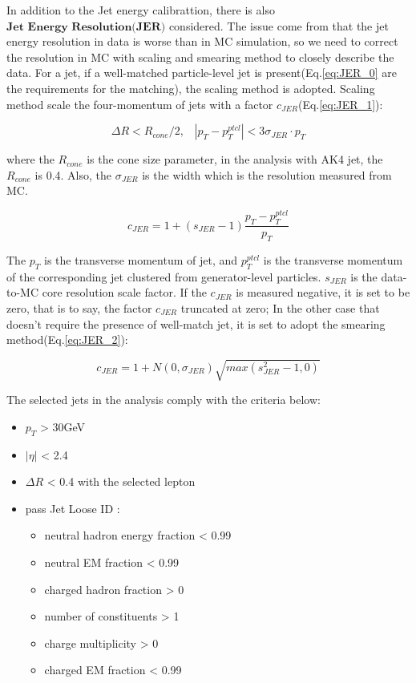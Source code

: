 		In addition to the Jet energy calibrattion, there is also $\textbf{Jet Energy Resolution(JER)}$ considered\cite{JER_twiki}. The issue come from that the jet energy resolution in data is worse than in MC simulation, so we need to correct the resolution in MC with scaling and smearing method to closely describe the data. For a jet, if a well-matched particle-level jet is present(Eq.\ref{eq:JER_0} are the requirements for the matching), the scaling method is adopted. Scaling method scale the four-momentum of jets with a factor $c_{JER}$(Eq.\ref{eq:JER_1}):

		\begin{equation}
		\Delta R < R_{cone}/2, \; \; \; |p_T-p_T^{ptcl}| < 3 \sigma_{JER} \cdot p_T
		\label{eq:JER_0}
		\end{equation}
		\FloatBarrier

		where the $R_{cone}$ is the cone size parameter, in the analysis with AK4 jet, the $R_{cone}$ is 0.4. Also, the $\sigma_{JER}$ is the width which is the resolution measured from MC.

		\begin{equation}
		c_{JER} = 1 + (s_{JER} - 1)\frac{p_T-p_T^{ptcl}}{p_T}
		\label{eq:JER_1}
		\end{equation}
		\FloatBarrier

		The $p_T$ is the transverse momentum of jet, and $p_T^{ptcl}$ is the transverse momentum of the corresponding jet clustered from generator-level particles. $s_{JER}$ is the data-to-MC core resolution scale factor. If the $c_{JER}$ is measured negative, it is set to be zero, that is to say, the factor $c_{JER}$ truncated at zero; In the other case that doesn't require the presence of well-match jet, it is set to adopt the smearing method(Eq.\ref{eq:JER_2}):

		\begin{equation}
		c_{JER} = 1 + N(0,\sigma_{JER})\sqrt{max(s_{JER}^2-1,0)}
		\label{eq:JER_2}
		\end{equation}
		\FloatBarrier

		The selected jets in the analysis comply with the criteria below:

		\begin{itemize}
		\item $p_T$ > 30GeV
		\item $|\eta|$ < 2.4
		\item $\Delta R$ < 0.4 with the selected lepton
		\item pass Jet Loose ID : \cite{JetLooseID_twiki}
		\begin{itemize}
			\item neutral hadron energy fraction < 0.99
			\item neutral EM fraction < 0.99
			\item charged hadron fraction > 0
			\item number of constituents > 1
			\item charge multiplicity > 0
			\item charged EM fraction < 0.99
		\end{itemize}
		\label{PhysObj:itm:sel_jet}
		\end{itemize}
		

